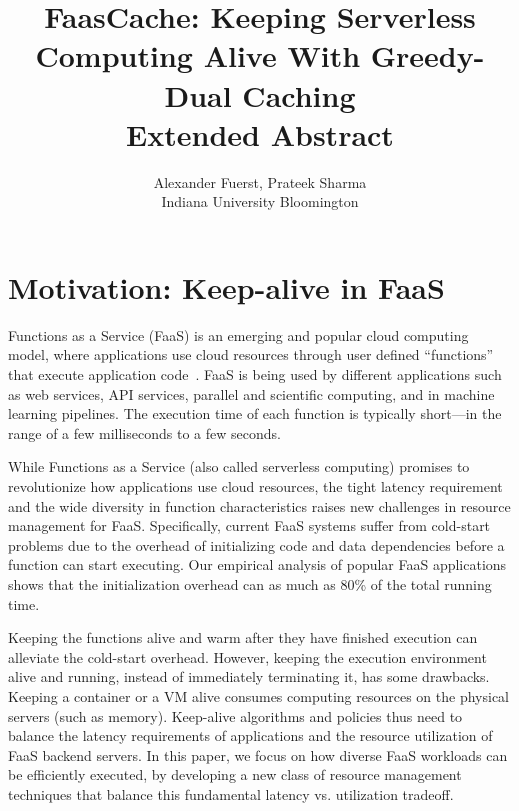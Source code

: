 \documentclass[pageno]{jpaper}
\begin{document}

\title{FaasCache: Keeping Serverless Computing Alive With Greedy-Dual Caching \\
Extended Abstract}

\date{}

\author{Alexander Fuerst, Prateek Sharma \\
Indiana University Bloomington}

\maketitle 

\thispagestyle{empty}

\section{Motivation: Keep-alive in FaaS}
\vspace*{\subsecspace}
Functions as a Service (FaaS) is an emerging and popular cloud computing model, where applications use cloud resources through user defined ``functions'' that execute application code~\cite{jonas_cloud_2019}.
%
FaaS is being used by different applications such as web services, API services, parallel and scientific computing, and in machine learning pipelines. 
%
The execution time of each function is typically short---in the range of a few milliseconds to a few seconds. 


While Functions as a Service (also called serverless computing) promises to revolutionize how applications use cloud resources, the tight latency requirement and the wide diversity in function characteristics raises new challenges in resource management for FaaS. 
%
Specifically, current FaaS systems suffer from cold-start problems due to the overhead of initializing code and data dependencies before a function can start executing.
Our empirical analysis of popular FaaS applications shows that the initialization overhead can as much as 80\% of the total running time. 

Keeping the functions alive and warm after they have finished execution can alleviate the cold-start overhead.  
However, keeping the execution environment alive and running, instead of immediately terminating it, has some drawbacks. 
Keeping a container or a VM alive consumes computing resources on the physical servers (such as memory). 
Keep-alive algorithms and policies thus need to balance the latency requirements of applications and the resource utilization of FaaS backend servers.
%
In this paper, we focus on how diverse FaaS workloads can be efficiently executed, by developing a new class of resource management techniques that balance this fundamental latency vs. utilization tradeoff. 
\end{document}
